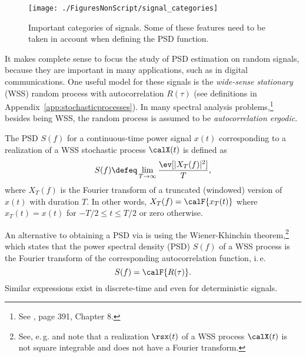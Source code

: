 \begin{figure}[htbp]
\centering
\texttt{[image: ./FiguresNonScript/signal\_categories]}
\caption{Important categories of signals. Some of these features need to be taken in account when
defining the PSD function.\label{fig:signal_categories}}
\end{figure}



It makes complete sense to focus the study of PSD estimation on random signals, because they are important in many applications, such as in digital communications. One useful model for these signals is the \emph{wide-sense stationary} (WSS) random process with autocorrelation $R(\tau)$ (see definitions in Appendix~\ref{app:stochasticprocesses}). In many spectral analysis problems,\footnote{See \cite{Hayes2009}, page 391, Chapter 8.} besides being WSS, the random process 
is assumed to be \emph{autocorrelation ergodic}.

The PSD $S(f)$ for a continuous-time power signal $x(t)$ corresponding to a realization of a WSS stochastic process $\calX(t)$ is defined as
\begin{equation}
S(f) \defeq \lim_{T \rightarrow \infty} \frac{\ev[|X_T(f)|^2]}{T},
\label{eq:psd_continuoustime}
\end{equation}
where $X_T(f)$ is the Fourier transform of a truncated (windowed) version of $x(t)$ with duration $T$. In other words, $X_T(f) = \calF \{ x_T(t) \}$ where $x_T(t)=x(t)$ for $-T/2 \le t \le T/2$ or zero otherwise.

An alternative to obtaining a PSD via  is using the Wiener-Khinchin theorem,\footnote{See, e.\,g.  and note that a realization $\rsx(t)$ of a WSS process $\calX(t)$ is not square integrable and does not have a Fourier transform.} %
which states that the power spectral density (PSD) $S(f)$ of a WSS process is the Fourier transform of the corresponding autocorrelation function, i.\,e.
\begin{equation}
S(f) = \calF \{ R(\tau) \}.
\label{eq:auto_psd_continuous}
\end{equation}
Similar expressions exist in discrete-time and even for deterministic signals.

